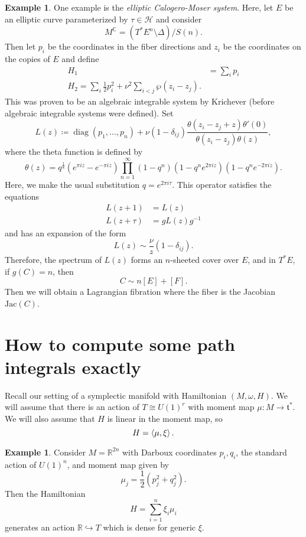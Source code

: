 \documentclass[leqno, openany]{memoir}
\theoremstyle{definition}
\newtheorem{exm}[thm]{Example}
\theoremstyle{remark}
\theoremstyle{plain}
\theoremstyle{definition}
\theoremstyle{remark}
\newcommand{\R}{\mathbb{R}}
\newcommand{\C}{\mathbb{C}}
\newcommand{\mc}[1]{\mathcal{#1}}
\newcommand{\mf}[1]{\mathfrak{#1}}
\newcommand{\mr}[1]{\mathrm{#1}}
\newcommand{\on}[1]{\operatorname{#1}}
\begin{document}
\begin{exm}
  One example is the \textit{elliptic Calogero-Moser system}. Here, let $E$ be an elliptic curve parameterized by $\tau \in \mc{H}$ and consider
  \[ M^{\C} = ( T^* E^n \setminus \Delta )/S(n). \]
  Then let $p_i$ be the coordinates in the fiber directions and $z_i$ be the coordinates on the copies of $E$ and define
  \begin{align*}
    H_1 &= \sum_i p_i \\
    H_2 = \sum_i \frac{1}{2} p_i^2 + \nu^2 \sum_{i<j} \wp(z_i - z_j).
  \end{align*}
  This was proven to be an algebraic integrable system by Krichever (before algebraic integrable systems were defined). Set
  \[ L(z) \coloneqq \on{diag}(p_1, \ldots, p_n) + \nu(1-\delta_{ij}) \frac{\theta(z_i-z_j+z) \theta'(0)}{\theta(z_i-z_j) \theta(z)}, \]
  where the theta function is defined by
  \[ \theta(z) = q^{\frac{1}{8}} (e^{\pi i z} - e^{-\pi i z}) \prod_{n=1}^{\infty} (1-q^n)(1-q^n e^{2\pi i z})(1-q^n e^{-2\pi i z}). \]
  Here, we make the usual substitution $q = e^{2\pi i \tau}$. This operator satisfies the equations
  \begin{align*}
    L(z+1) &= L(z) \\
    L(z+\tau) &= g L(z) g^{-1}
  \end{align*}
  and has an expansion of the form
  \[ L(z) \sim \frac{\nu}{z} (1-\delta_{ij}). \]
  Therefore, the spectrum of $L(z)$ forms an $n$-sheeted cover over $E$, and in $T^* E$, if $g(C) = n$, then
  \[ C \sim n [E] + [F]. \]
  Then we will obtain a Lagrangian fibration where the fiber is the Jacobian $\mr{Jac}(C)$.
\end{exm}

\section{How to compute some path integrals exactly}
\label{sec:path_integrals}

Recall our setting of a symplectic manifold with Hamiltonian $(M, \omega, H)$. We will assume that there is an action of $T \cong U(1)^r$ with moment map $\mu \colon M \to \mf{t}^*$. We will also assume that $H$ is linear in the moment map, so
\[ H = \ev{\mu, \xi}. \]

\begin{exm}
  Consider $M = \R^{2n}$ with Darboux coordinates $p_i, q_i$, the standard action of $U(1)^n$, and moment map given by
  \[ \mu_j = \frac{1}{2} (p_j^2 + q_j^2). \]
  Then the Hamiltonian
  \[ H = \sum_{i=1}^n \xi_i \mu_i \]
  generates an action $\R \hookrightarrow T$ which is dense for generic $\xi$.
\end{exm}
\end{document}
